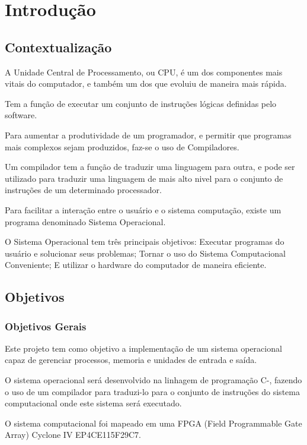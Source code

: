 \setcounter{secnumdepth}{2}

\section{Introduç\~ao}

\subsection{Contextualização}

A Unidade Central de Processamento, ou CPU, é um dos componentes mais vitais do computador, e também um dos que evoluiu de maneira mais rápida.

Tem a função de executar um conjunto de instruções lógicas definidas pelo software.

Para aumentar a produtividade de um programador, e permitir que programas mais complexos sejam produzidos, faz-se o uso de Compiladores.

Um compilador tem a funç\~ao de traduzir uma linguagem para outra, e pode ser utilizado para traduzir uma linguagem de mais alto nivel para o conjunto de instruç\~oes de um determinado processador.

Para facilitar a interação entre o usuário e o sistema computação, existe um programa denominado Sistema Operacional.

O Sistema Operacional tem três principais objetivos: Executar programas do usuário e solucionar seus problemas; Tornar o uso do Sistema Computacional Conveniente; E utilizar o hardware do computador de maneira eficiente.

\subsection{Objetivos}

\subsubsection{Objetivos Gerais}

Este projeto tem como objetivo a implementaç\~ao de um 
sistema operacional capaz de gerenciar processos, memoria e unidades de entrada e saída.

O sistema operacional será desenvolvido na linhagem de programação C-, fazendo o uso de um compilador para traduzi-lo para o conjunto de instruções do sistema computacional onde este sistema será executado.

O sistema computacional foi mapeado em uma FPGA (Field
Programmable Gate Array) Cyclone IV EP4CE115F29C7.

